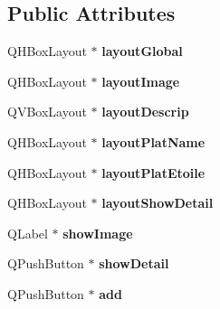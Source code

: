 \subsection*{Public Attributes}
\begin{DoxyCompactItemize}
\item 
Q\+H\+Box\+Layout $\ast$ {\bfseries layout\+Global}\hypertarget{classplat_intro_a04721e0c108bec838bf50eb55d876b43}{}\label{classplat_intro_a04721e0c108bec838bf50eb55d876b43}

\item 
Q\+H\+Box\+Layout $\ast$ {\bfseries layout\+Image}\hypertarget{classplat_intro_ad37ba70bb06c3f8bf6ce6b5239f54084}{}\label{classplat_intro_ad37ba70bb06c3f8bf6ce6b5239f54084}

\item 
Q\+V\+Box\+Layout $\ast$ {\bfseries layout\+Descrip}\hypertarget{classplat_intro_ad1c42e7ee46cb3200108bdbee9aea852}{}\label{classplat_intro_ad1c42e7ee46cb3200108bdbee9aea852}

\item 
Q\+H\+Box\+Layout $\ast$ {\bfseries layout\+Plat\+Name}\hypertarget{classplat_intro_a6bfc90f5a1e536c1b0beaa697eec310b}{}\label{classplat_intro_a6bfc90f5a1e536c1b0beaa697eec310b}

\item 
Q\+H\+Box\+Layout $\ast$ {\bfseries layout\+Plat\+Etoile}\hypertarget{classplat_intro_a77a9a5fb503842c3af4c917e4b6b67c4}{}\label{classplat_intro_a77a9a5fb503842c3af4c917e4b6b67c4}

\item 
Q\+H\+Box\+Layout $\ast$ {\bfseries layout\+Show\+Detail}\hypertarget{classplat_intro_abcc680ffa3a0b5c0d87033bbc917f122}{}\label{classplat_intro_abcc680ffa3a0b5c0d87033bbc917f122}

\item 
Q\+Label $\ast$ {\bfseries show\+Image}\hypertarget{classplat_intro_a8a8337e79d98538a66a255fe9cbf2222}{}\label{classplat_intro_a8a8337e79d98538a66a255fe9cbf2222}

\item 
Q\+Push\+Button $\ast$ {\bfseries show\+Detail}\hypertarget{classplat_intro_ac24d01413affd6ad5cd24109d0b6b277}{}\label{classplat_intro_ac24d01413affd6ad5cd24109d0b6b277}

\item 
Q\+Push\+Button $\ast$ {\bfseries add}\hypertarget{classplat_intro_aa5672e30a23fa5d091883f2a2d868d31}{}\label{classplat_intro_aa5672e30a23fa5d091883f2a2d868d31}


\end{DoxyCompactItemize}
